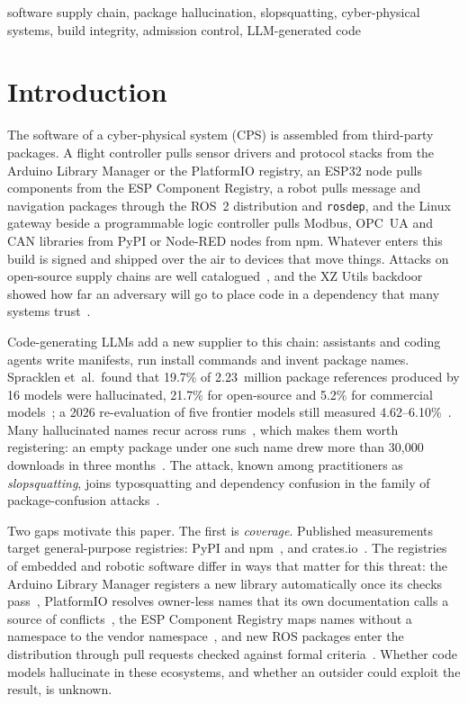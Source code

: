 \documentclass[conference]{IEEEtran}
\begin{document}
\begin{IEEEkeywords}
software supply chain, package hallucination, slopsquatting, cyber-physical systems, build integrity, admission control, LLM-generated code
\end{IEEEkeywords}

\section{Introduction}
\label{sec:intro}

The software of a cyber-physical system (CPS) is assembled from third-party packages. A flight controller pulls
sensor drivers and protocol stacks from the Arduino Library Manager or the PlatformIO registry, an ESP32 node pulls
components from the ESP Component Registry, a robot pulls message and navigation packages through the ROS~2
distribution and \texttt{rosdep}, and the Linux gateway beside a programmable logic controller pulls Modbus, OPC~UA
and CAN libraries from PyPI or Node-RED nodes from npm. Whatever enters this build is signed and shipped over the air
to devices that move things. Attacks on open-source supply chains are well catalogued~\cite{ladisa2023sok,ohm2020backstabber,cordey2023},
and the XZ Utils backdoor showed how far an adversary will go to place code in a dependency that many systems
trust~\cite{przymus2025wolves}.

Code-generating LLMs add a new supplier to this chain: assistants and coding agents write manifests, run install
commands and invent package names. Spracklen et~al.\ found that 19.7\% of 2.23~million package references produced by
16 models were hallucinated, 21.7\% for open-source and 5.2\% for commercial models~\cite{spracklen2025package}; a
2026 re-evaluation of five frontier models still measured 4.62--6.10\%~\cite{churilov2026range}. Many hallucinated
names recur across runs~\cite{spracklen2025package}, which makes them worth registering: an empty package under one
such name drew more than 30{,}000 downloads in three months~\cite{lanyado2024}. The attack, known among practitioners as \emph{slopsquatting}, joins typosquatting and
dependency confusion in the family of package-confusion attacks~\cite{neupane2023beyond,birsan2021}.

Two gaps motivate this paper. The first is \emph{coverage}. Published measurements target general-purpose registries:
PyPI and npm~\cite{spracklen2025package,lanyado2024}, and crates.io~\cite{krishna2025phantoms,zheng2026crates}. The
registries of embedded and robotic software differ in ways that matter for this threat: the Arduino Library Manager
registers a new library automatically once its checks pass~\cite{arduinoregistry}, PlatformIO resolves owner-less names
that its own documentation calls a source of conflicts~\cite{piodeps}, the ESP Component Registry maps names without
a namespace to the vendor namespace~\cite{espcm}, and new ROS packages enter the distribution through pull requests
checked against formal criteria~\cite{rosdistro}. Whether code models hallucinate in these ecosystems, and whether an
outsider could exploit the result, is unknown.
\end{document}
